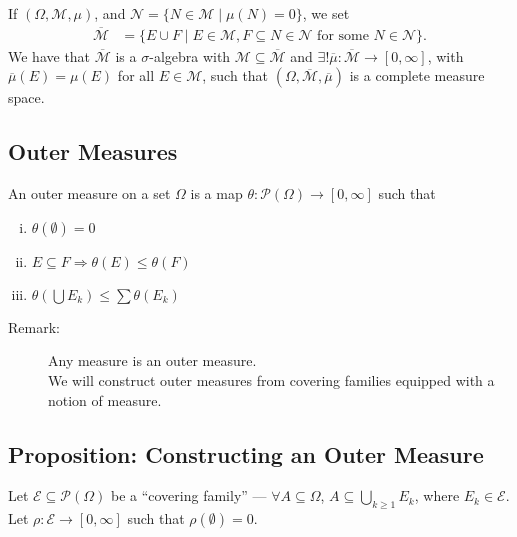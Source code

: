 \documentclass[9pt]{extarticle}
\begin{document}
  If $(\Omega,\mathcal{M},\mu)$, and $\mathcal{N} = \{N\in \mathcal{M}\mid \mu(N) = 0\}$, we set
  \begin{align*}
    \overline{\mathcal{M}} &= \{E\cup F\mid E\in \mathcal{M},F\subseteq N\in \mathcal{N}\text{ for some $N\in \mathcal{N}$}\}.
  \end{align*}
  We have that $ \overline{\mathcal{M}} $ is a $\sigma$-algebra with $\mathcal{M}\subseteq \overline{\mathcal{M}}$ and $\exists! \overline{\mu}: \overline{\mathcal{M}}\rightarrow [0,\infty]$, with $\overline{\mu}(E) = \mu(E)$ for all $E\in \mathcal{M}$, such that $(\Omega, \overline{\mathcal{M}},\overline{\mu})$ is a complete measure space.
  \subsection{Outer Measures}%
  An outer measure on a set $\Omega$ is a map $\theta: \mathcal{P}(\Omega)\rightarrow [0,\infty]$ such that
  \begin{enumerate}[(i)]
    \item $\theta(\emptyset) = 0$
    \item $E\subseteq F \Rightarrow \theta(E) \leq \theta(F)$
    \item $\theta\left(\bigcup E_k\right) \leq \sum \theta(E_k)$
  \end{enumerate}
  \begin{description}
    \item[Remark:] Any measure is an outer measure.\\

      We will construct outer measures from covering families equipped with a notion of measure.
  \end{description}
  \subsection{Proposition: Constructing an Outer Measure}%
  Let $\mathcal{E}\subseteq \mathcal{P}(\Omega)$ be a ``covering family'' --- $\forall A\subseteq \Omega$, $A\subseteq \bigcup_{k\geq 1}E_k$, where $E_k\in \mathcal{E}$. Let $\rho: \mathcal{E} \rightarrow [0,\infty]$ such that $\rho(\emptyset) = 0$.\\
\end{document}
